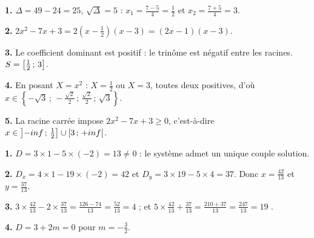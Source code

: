 \begin{corrige}
\textbf{1.} $\Delta = 49-24 = 25$, $\sqrt\Delta = 5$ :
$x_{1} = \frac{7-5}{4} = \frac12$ et $x_{2} = \frac{7+5}{4} = 3$.

\textbf{2.} $2x^{2}-7x+3 = 2\left(x-\frac12\right)(x-3) = (2x-1)(x-3)$.

\textbf{3.} Le coefficient dominant est positif : le trinôme est négatif
entre les racines. $S = \left[\frac12\,;\,3\right]$.

\textbf{4.} En posant $X = x^{2}$ : $X = \frac12$ ou $X = 3$, toutes deux
positives, d'où
$x \in \left\{-\sqrt3\,;\,-\frac{\sqrt2}{2}\,;\,\frac{\sqrt2}{2}\,;\,
\sqrt3\right\}$.

\textbf{5.} La racine carrée impose $2x^{2}-7x+3 \geq 0$, c'est-à-dire
$x \in \left]-inf\,;\,\frac12\right]\cup\left[3\,;\,+inf\right[$.
\end{corrige}

\begin{corrige}
\textbf{1.} $D = 3\times1-5\times(-2) = 13 \neq 0$ : le système admet un
unique couple solution.

\textbf{2.} $D_{x} = 4\times1-19\times(-2) = 42$ et
$D_{y} = 3\times19-5\times4 = 37$. Donc $x = \frac{42}{13}$ et
$y = \frac{37}{13}$.

\textbf{3.} $3\times\frac{42}{13}-2\times\frac{37}{13}
= \frac{126-74}{13} = \frac{52}{13} = 4$ \checkmark ; et
$5\times\frac{42}{13}+\frac{37}{13} = \frac{210+37}{13} = \frac{247}{13}
= 19$ \checkmark.

\textbf{4.} $D = 3+2m = 0$ pour $m = -\frac32$.
\end{corrige}

